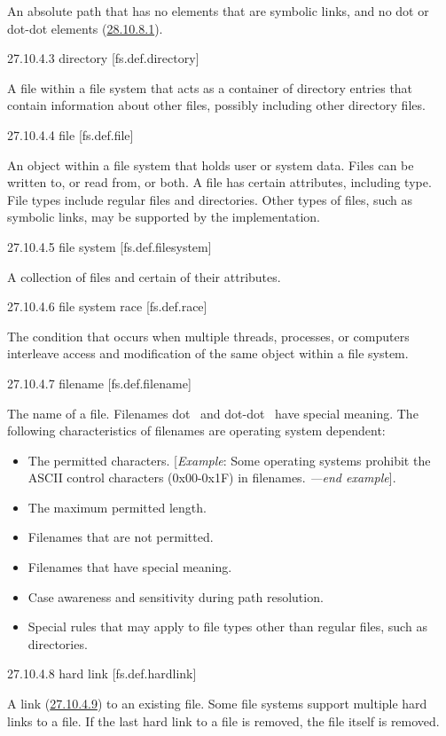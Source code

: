 An absolute path that has no elements that are symbolic links, and no
dot or dot-dot elements (\hyperref[path.generic]{28.10.8.1}).

27.10.4.3 directory {[}fs.def.directory{]}

A file within a file system that acts as a container of directory
entries that contain information about other files, possibly including
other directory files.

27.10.4.4 file {[}fs.def.file{]}

An object within a file system that holds user or system data. Files can
be written to, or read from, or both. A file has certain attributes,
including type. File types include regular files and directories. Other
types of files, such as symbolic links, may be supported by the
implementation.

27.10.4.5 file system {[}fs.def.filesystem{]}

A collection of files and certain of their attributes.

27.10.4.6 file system race {[}fs.def.race{]}

The condition that occurs when multiple threads, processes, or computers
interleave access and modification of the same object within a file
system.

27.10.4.7 filename {[}fs.def.filename{]}

The name of a file. Filenames dot~ and dot-dot~ have special meaning.
The following characteristics of filenames are operating system
dependent:

\begin{itemize}
\tightlist
\item
  The permitted characters. {[}\emph{Example}: Some operating systems
  prohibit the ASCII control characters (0x00-0x1F) in filenames.
  \emph{---end example}{]}.
\item
  The maximum permitted length.
\item
  Filenames that are not permitted.
\item
  Filenames that have special meaning.
\item
  Case awareness and sensitivity during path resolution.
\item
  Special rules that may apply to file types other than regular files,
  such as directories.
\end{itemize}

27.10.4.8 hard link {[}fs.def.hardlink{]}

A link (\hyperref[fs.def.link]{27.10.4.9}) to an existing file. Some
file systems support multiple hard links to a file. If the last hard
link to a file is removed, the file itself is removed.

